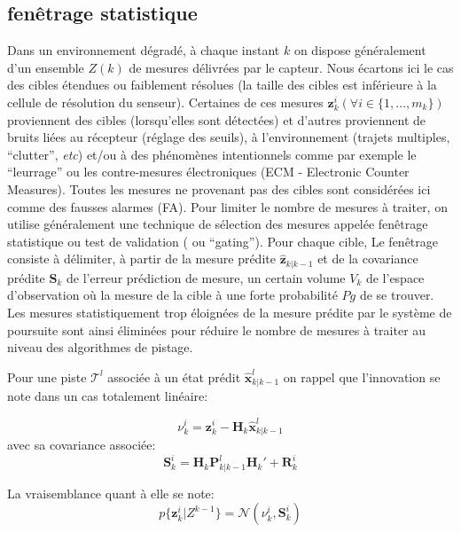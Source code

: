 \documentclass[10pt,french,a4paper]{report}
\begin{document}
									\subsection{fenêtrage statistique}
									\label{SectionFenetrageStat}
									Dans un environnement dégradé, à chaque instant $k$ on dispose généralement d'un ensemble  $Z(k)$ de mesures délivrées par le capteur. Nous écartons ici le cas des cibles étendues ou faiblement résolues (la taille des cibles est inférieure à la cellule de résolution du senseur).  
		Certaines de ces mesures $\mathbf{z}^i_k (\forall i \in \{1,\ldots,m_k\})$ proviennent des cibles (lorsqu'elles sont détectées) et d'autres proviennent de bruits liées au récepteur (réglage des seuils), à l'environnement (trajets multiples, ``clutter'',
		\textit{etc}) et/ou à des phénomènes intentionnels comme par exemple le ``leurrage'' ou les contre-mesures
		électroniques (ECM - Electronic Counter Measures). Toutes les mesures ne provenant pas des cibles sont
		considérées ici comme des fausses alarmes (FA).
		Pour limiter le nombre de mesures à traiter, on utilise généralement une technique de sélection des
		mesures appelée fenêtrage statistique ou test de validation   ( ou ``gating''). Pour chaque cible,
		Le fenêtrage consiste à délimiter, à partir de la mesure prédite $\hat{\mathbf{z}}_{k|k-1}$  et de la covariance prédite $\mathbf{S}_k$
		de l'erreur prédiction de mesure, un certain volume $V_k$ de l'espace d'observation où la mesure de la cible à une forte probabilité $Pg$ de se trouver. Les mesures statistiquement trop éloignées de la mesure prédite
		par le système de poursuite sont ainsi éliminées pour réduire le nombre de mesures à traiter au niveau des algorithmes de pistage. 
		
		Pour une piste $\mathcal{T}^l$ associée à un état prédit $\hat{\mathbf{x}}_{k|k-1}^l$ on rappel que l'innovation se note dans un cas totalement linéaire:
		
		 					\begin{equation} 
							\nu_k^i =   \mathbf{z}^i_k - \mathbf{H}_k\hat{\mathbf{x}}_{k|k-1}^l
							\end{equation}	
						avec sa covariance associée:
			 					\begin{equation} 
							\mathbf{S}_k^i =   \mathbf{H}_k \mathbf{P}_{k|k-1}^l \mathbf{H}_k' + \mathbf{R}_k^i
							\end{equation}				
		
		La vraisemblance quant à elle se note:
			 					\begin{equation} 
		 p\{ \mathbf{z}^i_k | Z^{k-1}\} = \mathcal{N}(\nu_k^i, \mathbf{S}_k^i)
							\end{equation}
							
\end{document}
